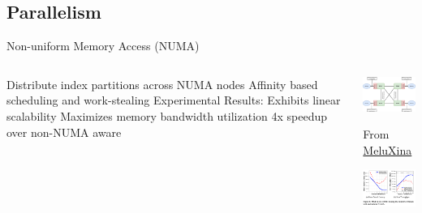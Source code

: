 \subsection{Parallelism}

\placelogofalse
\begin{frame}{Non-uniform Memory Access (NUMA)}
\begin{columns}
\centering
\begin{outline}
  \1 Distribute index partitions across NUMA nodes
  \1 Affinity based scheduling and work-stealing
  \1 Experimental Results:
  \2 Exhibits linear scalability
  \2 Maximizes memory bandwidth utilization
  \2 4x speedup over non-NUMA aware
\end{outline}

\begin{center}
\centering
\includegraphics[width=4.0cm]{assets/NUMA.png}

{\tiny From \href{https://docs.lxp.lu/system/images/NUMA.png}{MeluXina}}

\vspace{0.5cm}

\includegraphics[width=5.5cm]{assets/numa_fig.png}
\end{center}
\end{columns}
\end{frame}
\placelogotrue
